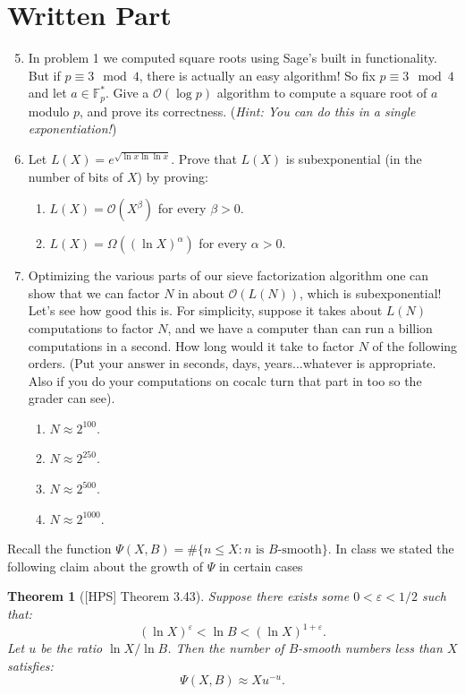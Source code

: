 \documentclass[11pt]{article}
\newtheorem{theorem}{Theorem}
\newcommand{\bF}{\mathbb{F}}
\newcommand{\cO}{\mathcal{O}}
\begin{document}
\section*{Written Part}
\begin{enumerate}
  \setcounter{enumi}{4}
  \item{
  In problem 1 we computed square roots using Sage's built in functionality.  But if $p\equiv 3\mod 4$, there is actually an easy algorithm!  So fix $p\equiv 3\mod 4$ and let $a\in\bF_p^*$.  Give a $\cO(\log p)$ algorithm to compute a square root of $a$ modulo $p$, and prove its correctness.  (\textit{Hint: You can do this in a single exponentiation!})
  }
  \item{
  Let $L(X) = e^{\sqrt{\ln x\ln\ln x}}$.  Prove that $L(X)$ is subexponential (in the number of bits of $X$) by proving:
  \begin{enumerate}
    \item{
    $L(X) = \cO(X^\beta)$ for every $\beta>0$.
    }
    \item{
    $L(X) = \Omega((\ln X)^\alpha)$ for every $\alpha>0$.
    }
  \end{enumerate}
  }
  \item{
  Optimizing the various parts of our sieve factorization algorithm one can show that we can factor $N$ in about $\cO(L(N))$, which is subexponential!  Let's see how good this is.  For simplicity, suppose it takes about $L(N)$ computations to factor $N$, and we have a computer than can run a billion computations in a second.  How long would it take to factor $N$ of the following orders.  (Put your answer in seconds, days, years...whatever is appropriate.  Also if you do your computations on cocalc turn that part in too so the grader can see).
  \begin{enumerate}
    \item{$N\approx 2^{100}$.}
    \item{$N\approx 2^{250}$.}
    \item{$N\approx 2^{500}$.}
    \item{$N\approx 2^{1000}$.}
  \end{enumerate}
  }
\end{enumerate}
Recall the function $\Psi(X,B) =\#\{n\le X:n\text{ is }B\text{-smooth}\}.$  In class we stated the following claim about the growth of $\Psi$ in certain cases
\begin{theorem}[{[HPS] Theorem 3.43}]\label{TechnicalBit}
  Suppose there exists some $0<\varepsilon<1/2$ such that:
  \[(\ln X)^\varepsilon < \ln B < (\ln X)^{1+\varepsilon}.\]
  Let $u$ be the ratio $\ln X/\ln B$.  Then the number of $B$-smooth numbers less than $X$ satisfies:
  \[\Psi(X,B)\approx X u^{-u}.\]
\end{theorem}
\end{document}
